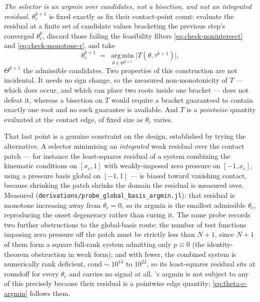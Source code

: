 \emph{The selector is an argmin over candidates, not a bisection, and not an integrated residual.} $\theta_c^{k+1}$ is fixed exactly as \cite{AgueroEtAl2026} fix their contact-point count: evaluate the residual at a finite set of candidate values bracketing the previous step's converged $\theta_c^k$, discard those failing the feasibility filters \eqref{eq:check-nonintersect} and \eqref{eq:check-monotone-r}, and take
\begin{equation}
    \theta_c^{k+1} \;=\; \operatorname*{arg\,min}_{\theta\in\Theta^{k+1}}\big|T(\theta,\tau^{k+1})\big|\text{,}
    \label{eq:theta-c-argmin}
\end{equation}
$\Theta^{k+1}$ the admissible candidates. Two properties of this construction are not incidental. It needs no sign change, so the measured non-monotonicity of $T$ --- which does occur, and which can place two roots inside one bracket --- does not defeat it, whereas a bisection on $T$ would require a bracket guaranteed to contain exactly one root and no such guarantee is available. And $T$ is a \emph{pointwise} quantity evaluated at the contact edge, of fixed size as $\theta_c$ varies.

That last point is a genuine constraint on the design, established by trying the alternative. A selector minimising an \emph{integrated} weak residual over the contact patch --- for instance the least-squares residual of a system combining the kinematic conditions on $[x_c,1]$ with weakly-imposed zero pressure on $[-1,x_c]$, using a pressure basis global on $[-1,1]$ --- is biased toward vanishing contact, because shrinking the patch shrinks the domain the residual is measured over. Measured (\texttt{derivations/probe\_global\_basis\_argmin.jl}): that residual is monotone increasing away from $\theta_c=0$, so its argmin is the smallest admissible $\theta_c$, reproducing the onset degeneracy rather than curing it. The same probe records two further obstructions to the global-basis route: the number of test functions imposing zero pressure off the patch must be strictly less than $N+1$, since $N+1$ of them form a square full-rank system admitting only $p\equiv0$ (the identity-theorem obstruction in weak form); and with fewer, the combined system is numerically rank deficient, $\mathrm{cond}\sim10^{14}$ to $10^{22}$, so its least-squares residual sits at roundoff for every $\theta_c$ and carries no signal at all. \cite{AgueroEtAl2026}'s argmin is not subject to any of this precisely because their residual is a pointwise edge quantity; \eqref{eq:theta-c-argmin} follows them.

